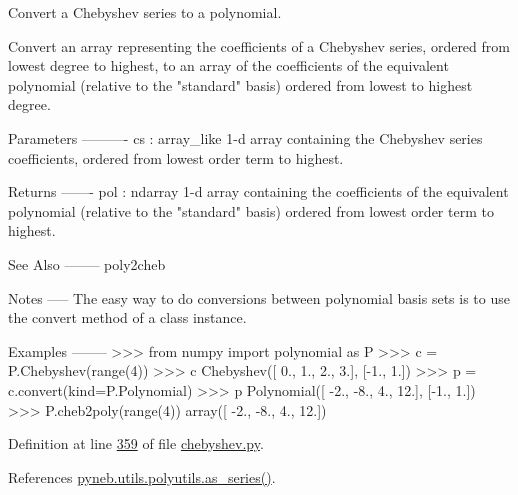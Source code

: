 \begin{DoxyVerb}Convert a Chebyshev series to a polynomial.

Convert an array representing the coefficients of a Chebyshev series,
ordered from lowest degree to highest, to an array of the coefficients
of the equivalent polynomial (relative to the "standard" basis) ordered
from lowest to highest degree.

Parameters
----------
cs : array_like
    1-d array containing the Chebyshev series coefficients, ordered
    from lowest order term to highest.

Returns
-------
pol : ndarray
    1-d array containing the coefficients of the equivalent polynomial
    (relative to the "standard" basis) ordered from lowest order term
    to highest.

See Also
--------
poly2cheb

Notes
-----
The easy way to do conversions between polynomial basis sets
is to use the convert method of a class instance.

Examples
--------
>>> from numpy import polynomial as P
>>> c = P.Chebyshev(range(4))
>>> c
Chebyshev([ 0.,  1.,  2.,  3.], [-1.,  1.])
>>> p = c.convert(kind=P.Polynomial)
>>> p
Polynomial([ -2.,  -8.,   4.,  12.], [-1.,  1.])
>>> P.cheb2poly(range(4))
array([ -2.,  -8.,   4.,  12.])\end{DoxyVerb}
 

Definition at line \hyperlink{chebyshev_8py_source_l00359}{359} of file \hyperlink{chebyshev_8py_source}{chebyshev.\-py}.



References \hyperlink{polyutils_8py_source_l00115}{pyneb.\-utils.\-polyutils.\-as\-\_\-series()}.


